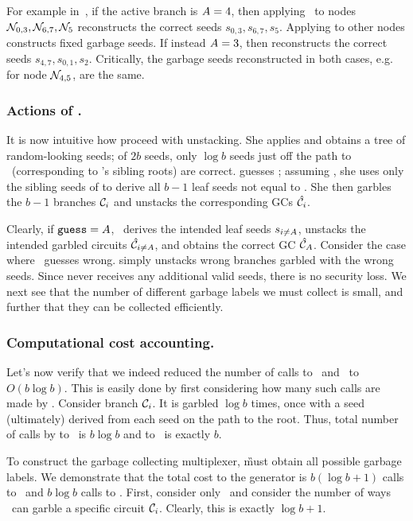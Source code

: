 For example in~, if the active branch is $A=4$,
then applying \gadget\ to nodes $\mathtt{\cal N}_{0,3}, \mathtt{\cal N}_{6,7},
\mathtt{\cal N}_{5}$ reconstructs the correct seeds $s_{0,3}, s_{6,7}, s_{5}$.  Applying \gadget to other nodes
constructs fixed garbage seeds.
If instead $A=3$, then \gadget
reconstructs the correct seeds $s_{4,7}, s_{0,1}, s_{2}$.
Critically, the
garbage seeds reconstructed
in both cases, e.g. for node $\mathtt{\cal N}_{4,5}$, are the same.


\subsubsection{Actions of \E.}

It is now intuitive how \E proceed with unstacking. 
She applies \gadget and obtains a tree of random-looking seeds; of $2b$
seeds, only $\log b$ seeds just off the path to \aid\ (corresponding
to \aid's sibling roots) are correct.  \E guesses \guess; assuming
\guess, she uses only the sibling seeds of \guess to derive all
$b-1$ leaf seeds not equal to \guess.  She then garbles the $b-1$
branches $\mathcal C_i$ and unstacks the corresponding GCs $\hat{\mathcal C}_i$.

Clearly, if $\mathtt{guess}=A$, \E\ derives the intended leaf seeds
$s_{i\neq A}$, unstacks the intended garbled circuits
$\hat{\mathcal C}_{i\neq A}$, and obtains the correct GC $\hat{\mathcal C}_{A}$.
%
Consider the case where \E\ guesses wrong. %
\E simply unstacks wrong branches garbled with the wrong seeds.
Since \E never receives any additional valid seeds,
there is no security loss.  We next see that the number of different
garbage labels we must collect is small, and further that they can be
collected efficiently.

\subsubsection{Computational cost accounting.} Let's now verify that
we indeed reduced the number of calls to \Gb\ and \Ev\ to $O(b \log
b)$.  This is easily done by first considering how many such calls are
made by \E.  Consider branch $\mathcal C_i$.  It is garbled $\log b$ times,
once with a seed (ultimately) derived from each seed on the path to
the root.  Thus, total number of calls by \E to \Gb\ is $b \log b$ and
to \Ev\ is exactly $b$.  

To construct the garbage collecting multiplexer, \G must obtain all possible garbage labels.  We
demonstrate that the total cost to the generator is $b (\log b +
1)$ calls to \Gb\ and $b \log b$ calls to \Ev.
First, consider only \Gb\ and consider the number of ways \E\ can garble a specific circuit $\mathcal C_i$. Clearly, this is exactly $\log b+1$.

